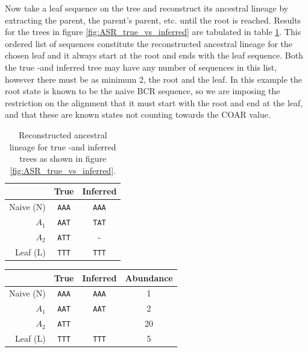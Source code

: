 Now take a leaf sequence on the tree and reconstruct its ancestral lineage by extracting the parent, the parent's parent, etc. until the root is reached.
Results for the trees in figure \ref{fig:ASR_true_vs_inferred} are tabulated in table \ref{true_vs_inferred_table}.
This ordered list of sequences constitute the reconstructed ancestral lineage for the chosen leaf and it always start at the root and ends with the leaf sequence.
Both the true -and inferred tree may have any number of sequences in this list, however there must be as minimum 2, the root and the leaf.
In this example the root state is known to be the naive BCR sequence, so we are imposing the restriction on the alignment that it must start with the root and end at the leaf, and that these are known states not counting towards the COAR value.

\begin{table}[ht!]
\centering
\begin{tabular}{rcc}
\multicolumn{1}{c}{} & True   & Inferred \\ \hline
Naive (N)            & \texttt{AAA} & \texttt{AAA}         \\ \hline
$A_1$                & \texttt{AAT} & \texttt{TAT}         \\ \hline
$A_2$                & \texttt{ATT} & -                    \\ \hline
Leaf (L)             & \texttt{TTT} & \texttt{TTT}         \\ \hline
\end{tabular}
    \caption{
         \label{true_vs_inferred_table}
             Reconstructed ancestral lineage for true -and inferred trees as shown in figure \ref{fig:ASR_true_vs_inferred}.
             }
\end{table}

\iffalse

\begin{table}[ht!]
\centering
\label{table:true_vs_inferred_table}
\begin{tabular}{rccc}
\multicolumn{1}{c}{} & True   & Inferred & Abundance \\ \hline
Naive (N)            & \texttt{AAA} & \texttt{AAA}   & 1         \\ \hline
$A_1$                & \texttt{AAT} & \texttt{AAT}   & 2         \\ \hline
$A_2$                & \texttt{ATT} &                  & 20        \\ \hline
Leaf (L)             & \texttt{TTT} & \texttt{TTT}   & 5         \\ \hline
\end{tabular}
\end{table}

